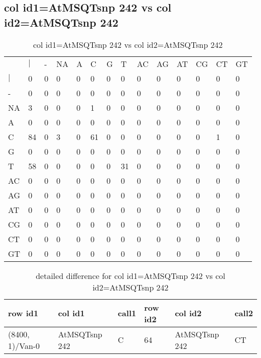 \subsection{col id1=AtMSQTsnp 242 vs col id2=AtMSQTsnp 242}
\begin{center}
\begin{longtable}{|l|l|l|l|l|l|l|l|l|l|l|l|l|l|}
\caption{col id1=AtMSQTsnp 242 vs col id2=AtMSQTsnp 242} \label{table_dm596}\\
\hline
\\
\hline
&$|$&-&NA&A&C&G&T&AC&AG&AT&CG&CT&GT\\
$|$&0&0&0&0&0&0&0&0&0&0&0&0&0\\
-&0&0&0&0&0&0&0&0&0&0&0&0&0\\
NA&3&0&0&0&1&0&0&0&0&0&0&0&0\\
A&0&0&0&0&0&0&0&0&0&0&0&0&0\\
C&84&0&3&0&61&0&0&0&0&0&0&1&0\\
G&0&0&0&0&0&0&0&0&0&0&0&0&0\\
T&58&0&0&0&0&0&31&0&0&0&0&0&0\\
AC&0&0&0&0&0&0&0&0&0&0&0&0&0\\
AG&0&0&0&0&0&0&0&0&0&0&0&0&0\\
AT&0&0&0&0&0&0&0&0&0&0&0&0&0\\
CG&0&0&0&0&0&0&0&0&0&0&0&0&0\\
CT&0&0&0&0&0&0&0&0&0&0&0&0&0\\
GT&0&0&0&0&0&0&0&0&0&0&0&0&0\\
\hline
\end{longtable}
\end{center}

\begin{center}
\begin{longtable}{|l|l|l|l|l|l|}
\caption{detailed difference for col id1=AtMSQTsnp 242 vs col id2=AtMSQTsnp 242} \label{table_dm597}\\
\hline
row id1&col id1&call1&row id2&col id2&call2\\
\hline
(8400, 1)/Van-0&AtMSQTsnp 242&C&64&AtMSQTsnp 242&CT\\
\hline
\end{longtable}
\end{center}

